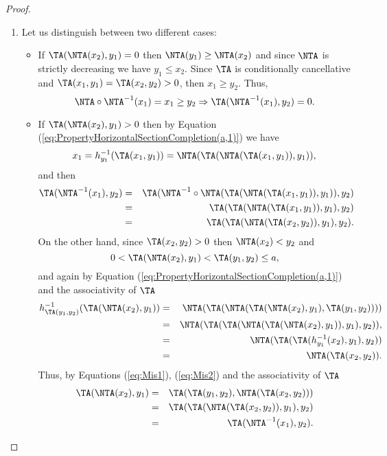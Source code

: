 \begin{proof} \hspace{0.5cm}
	\begin{enumerate}[label=(\roman*)]
		\item Let us distinguish between two different cases:
		\begin{itemize}
			\item If $\TA(\NTA(x_2),y_1)=0$ then $\NTA(y_1) \geq \NTA(x_2)$ and since $\NTA$ is strictly decreasing we have $y_1 \leq x_2$. Since $\TA$ is conditionally cancellative and $\TA(x_1,y_1)=\TA(x_2,y_2)>0$, then $x_1 \geq y_2$. Thus,
			$$\NTA \circ \NTA^{-1}(x_1)=x_1 \geq y_2 \Rightarrow \TA(\NTA^{-1}(x_1),y_2)=0.$$
			\item If $\TA(\NTA(x_2),y_1)>0$ then by Equation (\ref{eq:PropertyHorizontalSectionCompletion(a,1)}) we have
			$$x_1=h_{y_1}^{-1}(\TA(x_1,y_1)) = \NTA(\TA(\NTA(\TA(x_1,y_1)),y_1)),$$
			and then
			\begin{eqnarray}\label{eq:Mis1}
				\TA(\NTA^{-1}(x_1),y_2) &=& \TA(\NTA^{-1}\circ \NTA(\TA(\NTA(\TA(x_1,y_1)),y_1)),y_2) \nonumber\\
				&=& \TA(\TA(\NTA(\TA(x_1,y_1)),y_1),y_2)  \nonumber\\
				&=& \TA(\TA(\NTA(\TA(x_2,y_2)),y_1),y_2).
			\end{eqnarray}
			On the other hand, since $\TA(x_2,y_2)>0$ then $\NTA(x_2)< y_2$ and 
			$$0 < \TA(\NTA(x_2),y_1) < \TA(y_1,y_2) \leq a,$$
			 and again by Equation (\ref{eq:PropertyHorizontalSectionCompletion(a,1)}) and the associativity of $\TA$
			\begin{eqnarray}\label{eq:Mis2}
				h_{\TA(y_1,y_2)}^{-1}(\TA(\NTA(x_2),y_1)) & = & \NTA(\TA(\NTA(\TA(\NTA(x_2),y_1),\TA(y_1,y_2)))) \nonumber \\
				&=& \NTA(\TA(\TA(\NTA(\TA(\NTA(x_2),y_1)),y_1),y_2)), \nonumber \\
				&=& \NTA(\TA(\TA(h_{y_1}^{-1}(x_2),y_1),y_2)) \nonumber \\
				&=& \NTA(\TA(x_2,y_2)).
			\end{eqnarray}
			Thus, by Equations (\ref{eq:Mis1}), (\ref{eq:Mis2}) and the associativity of $\TA$
			\begin{eqnarray*}
				\TA(\NTA(x_2),y_1) &=& \TA(\TA(y_1,y_2),\NTA(\TA(x_2,y_2))) \\
				& = & \TA(\TA(\NTA(\TA(x_2,y_2)),y_1),y_2) \\
				& = & \TA(\NTA^{-1}(x_1),y_2).
			\end{eqnarray*}
			

\end{itemize}
\end{enumerate}
\end{proof}
